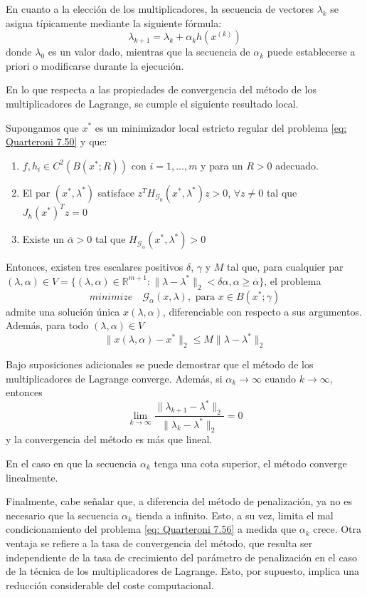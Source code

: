 En cuanto a la elección de los multiplicadores, la secuencia de vectores $\lambda_k$ se asigna típicamente mediante la siguiente fórmula:
\[ \lambda_{k + 1} = \lambda_k + \alpha_k h (x^{(k)}) \]
donde $\lambda_0$ es un valor dado, mientras que la secuencia de $\alpha_k$ puede establecerse a priori o modificarse durante la ejecución.

En lo que respecta a las propiedades de convergencia del método de los multiplicadores de Lagrange, se cumple el siguiente resultado local.

\begin{property}
    Supongamos que $x^*$ es un minimizador local estricto regular del problema \ref{eq: Quarteroni 7.50} y que:
    \begin{enumerate}
        \item $f, h_i \in C^2 (B (x^*; R))$ con $i = 1,..., m$ y para un $R > 0$ adecuado.
        \item El par $(x^*, \lambda^*)$ satisface $z^T H_{\mathcal{G}_0} (x^*, \lambda^*) z > 0$, $\forall z \neq 0$ tal que $J_h(x^*)^T z = 0$
        \item Existe un $\overline{\alpha} > 0$ tal que $H_{\mathcal{G}_{\overline{\alpha}}} (x^*, \lambda^*) > 0$
    \end{enumerate}

    Entonces, existen tres escalares positivos $\delta$, $\gamma$ y $M$ tal que, para cualquier par $(\lambda, \alpha) \in V = \{ (\lambda, \alpha) \in \mathbb{R}^{m + 1} : \|\lambda - \lambda^*\|_2 < \delta \alpha, \alpha \geq \overline{\alpha} \}$, el problema
    \[ minimize \quad \mathcal{G}_\alpha (x, \lambda), \text{ para } x \in B(x^*; \gamma) \]
    admite una solución única $x(\lambda, \alpha)$, diferenciable con respecto a sus argumentos. Además, para todo $(\lambda, \alpha) \in V$
    \[ \| x(\lambda, \alpha) - x^* \|_2 \leq M \| \lambda - \lambda^* \|_2 \]
\end{property}

Bajo suposiciones adicionales se puede demostrar que el método de los multiplicadores de Lagrange converge. Además, si $\alpha_k \rightarrow \infty$ cuando $k \rightarrow \infty$, entonces
\[ \lim_{k \rightarrow \infty} \frac{\| \lambda_{k + 1} - \lambda^* \|_2}{\| \lambda_k - \lambda^* \|_2} = 0 \]
y la convergencia del método es más que lineal.

En el caso en que la secuencia $\alpha_k$ tenga una cota superior, el método converge linealmente.

Finalmente, cabe señalar que, a diferencia del método de penalización, ya no es necesario que la secuencia $\alpha_k$ tienda a infinito. Esto, a su vez, limita el mal condicionamiento del problema \ref{eq: Quarteroni 7.56} a medida que $\alpha_k$ crece. Otra ventaja se refiere a la tasa de convergencia del método, que resulta ser independiente de la tasa de crecimiento del parámetro de penalización en el caso de la técnica de los multiplicadores de Lagrange. Esto, por supuesto, implica una reducción considerable del coste computacional.

